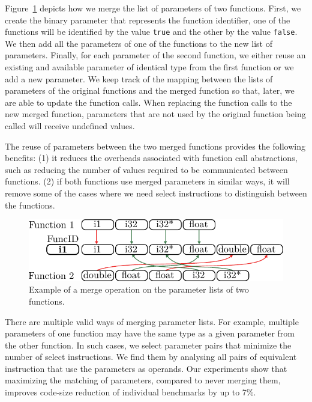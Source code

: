 Figure~\ref{fig:merged-params} depicts
how we merge the list of parameters of two functions.
First, we create the binary parameter that represents the function identifier,
one of the functions will be identified by the value \texttt{true} and the other
by the value \texttt{false}.
We then add all the parameters of one of the functions to the new list of
parameters.
Finally, for each parameter of the second function, we either reuse an existing
and available parameter of identical type from the first function or we add a
new parameter.
We keep track of the mapping between the lists of parameters of the
original functions and the merged function so that, later, we are able to
update the function calls.
When replacing the function calls to the new merged function, parameters that
are not used by the original function being called will receive undefined values.

The reuse of parameters between the two merged functions provides the following
benefits:
(1) it reduces the overheads associated with function call abstractions, such as
reducing the number of values required to be communicated between functions.
(2) if both functions use merged parameters in similar ways, it will remove some
of the cases where we need select instructions to distinguish between the functions.

\begin{figure}[t!]
  \centering
  \includegraphics[width=0.9\linewidth]{src/merge-operation/figs/merged-params}
  \caption{Example of a merge operation on the parameter lists of two functions.}
  \label{fig:merged-params}
\end{figure}

There are multiple valid ways of merging parameter lists. For example, multiple
parameters of one function may have the same type as a given parameter from the other
function. In such cases, we select parameter pairs that minimize the number of
select instructions. We find them by analysing all pairs of equivalent instruction
that use the parameters as operands. 
Our experiments show that maximizing the matching of parameters, compared to never
merging them, improves code-size reduction of individual benchmarks by up to 7\%.

